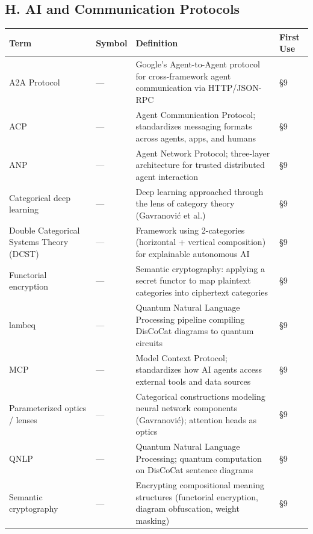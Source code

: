 \documentclass[
]{article}
\newcounter{none} %
\numberwithin{equation}{section}
\begin{document}
\subsection{H. AI and Communication
Protocols}\label{h.-ai-and-communication-protocols}

{\def\LTcaptype{none} %
\begin{longtable}[]{@{}
  >{\raggedright\arraybackslash}p{}
  >{\centering\arraybackslash}p{}
  >{\raggedright\arraybackslash}p{}
  >{\centering\arraybackslash}p{}@{}}
\toprule\noalign{}
\begin{minipage}[b]{\linewidth}\raggedright
Term
\end{minipage} & \begin{minipage}[b]{\linewidth}\centering
Symbol
\end{minipage} & \begin{minipage}[b]{\linewidth}\raggedright
Definition
\end{minipage} & \begin{minipage}[b]{\linewidth}\centering
First Use
\end{minipage} \\
\midrule\noalign{}
\endhead
\bottomrule\noalign{}
\endlastfoot
A2A Protocol & --- & Google's Agent-to-Agent protocol for
cross-framework agent communication via HTTP/JSON-RPC & §9 \\
ACP & --- & Agent Communication Protocol; standardizes messaging formats
across agents, apps, and humans & §9 \\
ANP & --- & Agent Network Protocol; three-layer architecture for trusted
distributed agent interaction & §9 \\
Categorical deep learning & --- & Deep learning approached through the
lens of category theory (Gavranović et al.) & §9 \\
Double Categorical Systems Theory (DCST) & --- & Framework using
2-categories (horizontal + vertical composition) for explainable
autonomous AI & §9 \\
Functorial encryption & --- & Semantic cryptography: applying a secret
functor to map plaintext categories into ciphertext categories & §9 \\
lambeq & --- & Quantum Natural Language Processing pipeline compiling
DisCoCat diagrams to quantum circuits & §9 \\
MCP & --- & Model Context Protocol; standardizes how AI agents access
external tools and data sources & §9 \\
Parameterized optics / lenses & --- & Categorical constructions modeling
neural network components (Gavranović); attention heads as optics &
§9 \\
QNLP & --- & Quantum Natural Language Processing; quantum computation on
DisCoCat sentence diagrams & §9 \\
Semantic cryptography & --- & Encrypting compositional meaning
structures (functorial encryption, diagram obfuscation, weight masking)
& §9 \\
\end{longtable}
}
\end{document}
